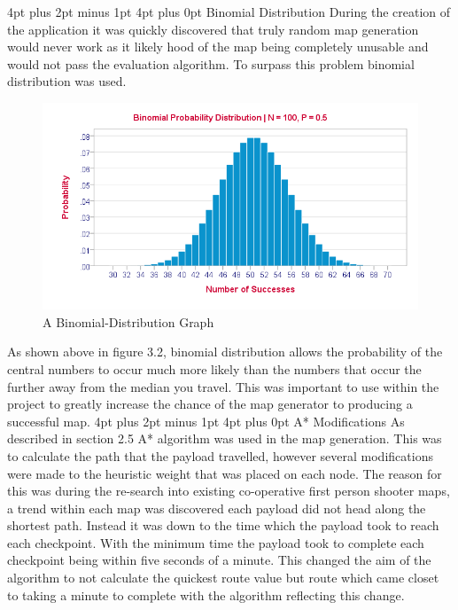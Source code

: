\documentclass[12pt,a4paper,oneside]{book}
\makeatletter
\renewcommand\section{\@startsection {section}{1}{0mm} %
                               {4pt plus 2pt minus 1pt} %
                               {4pt plus 0pt} %
                               {\bfseries}}
\makeatother
\begin{document}
\section{Binomial Distribution }
During the creation of the application it was quickly discovered that truly random map generation would never work as it likely hood of the map being completely unusable and would not pass the evaluation algorithm. To surpass this problem binomial distribution was used.
\begin{figure}[h]
	\includegraphics[width=1.0\textwidth]{images/binomial.png}
	\caption{A Binomial-Distribution Graph}
\end{figure}
\vspace{5mm} 
\newline
As shown above in figure 3.2, binomial distribution allows the probability of the central numbers to occur much more likely than the numbers that occur the further away from the median you travel. This was important to use within the project to greatly increase the chance of the map generator to producing a successful map. 
\vspace{5mm} 
\newline
\section{A* Modifications}
As described in section 2.5 A* algorithm was used in the map generation. This was to calculate the path that the payload travelled, however several modifications were made to the heuristic weight that was placed on each node. The reason for this was during the re-search into existing co-operative first person shooter maps\cite{Overwa}, a trend within each map was discovered each payload did not head along the shortest path. Instead it was down to the time which the payload took to reach each checkpoint. With the minimum time the payload took to complete each checkpoint being within five seconds of a minute. This changed the aim of the algorithm to not calculate the quickest route value but route which came closet to taking a minute to complete with the algorithm reflecting this change.
\vspace{5mm} 
\newline
\end{document}
